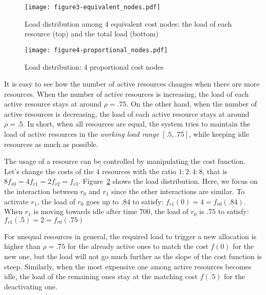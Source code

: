 \begin{figure}[tb]
  \begin{center}
    \texttt{[image: figure3-equivalent\_nodes.pdf]}
    \vspace{-5.0ex}
    \caption{Load distribution among 4 equivalent cost nodes:
      the load of each resource (top) and the total load (bottom)}
    \label{fig:4node}
  \end{center}
  \hspace{0.8\columnsep}
\end{figure}

\begin{figure}
  \begin{center}
    \texttt{[image: figure4-proportional\_nodes.pdf]}
    \vspace{-5.0ex}
    \caption{Load distribution: 4 proportional cost nodes}
    \label{fig:4node-ratio}
  \end{center}
\end{figure}

It is easy to see how the number of active resources changes when
there are more resources.
When the number of active resources is increasing, the load of each
active resource stays at around $\rho = .75$.
On the other hand, when the number of active resources is decreasing,
the load of each active resource stays at around $\rho = .5$.
In short, when all resources are equal, the system tries to maintain
the load of active resources in the {\em working load range}
$[.5, .75]$, while keeping idle resources as much as possible.

The usage of a resource can be controlled by manipulating the cost
function.
Let's change the costs of the 4 resources with the ratio $1:2:4:8$,
that is $8 f_{r0} = 4 f_{r1} = 2 f_{r2} = f_{r3}$.
Figure~\ref{fig:4node-ratio} shows the load distribution.
Here, we focus on the interaction between $r_{0}$ and $r_{1}$ since
the other interactions are similar.
To activate $r_{1}$, the load of $r_{0}$ goes up to $.84$ to satisfy:
$f_{r1}(0) = 4 = f_{r0}(.84)$.
When $r_{1}$ is moving towards idle after time 700, the load
of $r_{0}$ is $.75$ to satisfy: $f_{r1}(.5) = 2 = f_{r0}(.75)$

For unequal resources in general, the required load to trigger a new
allocation is higher than $\rho = .75$ for the already
active ones to match the cost $f(0)$ for the new one, but the load
will not go much further as the slope of the cost function is steep.
Similarly, when the most expensive one among active resources becomes
idle, the load of the remaining ones stay at the matching cost
$f(.5)$ for the deactivating one.

